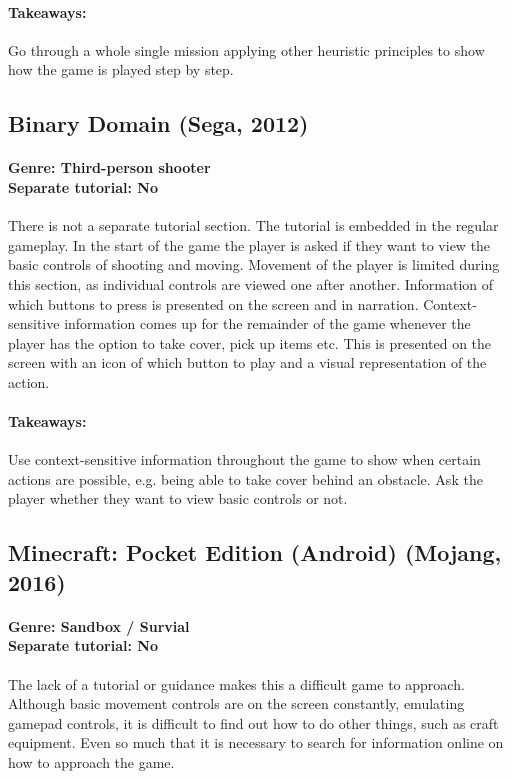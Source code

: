 \paragraph{Takeaways:}
Go through a whole single mission applying other heuristic principles to show how the game is played step by step.

\subsection{Binary Domain (Sega, 2012)}
\paragraph{Genre: Third-person shooter \\ Separate tutorial: No \\} 
There is not a separate tutorial section. The tutorial is embedded in the regular gameplay. In the start of the game the player is asked if they want to view the basic controls of shooting and moving. Movement of the player is limited during this section, as individual controls are viewed one after another. Information of which buttons to press is presented on the screen and in narration. Context-sensitive information comes up for the remainder of the game whenever the player has the option to take cover, pick up items etc. This is presented on the screen with an icon of which button to play and a visual representation of the action.
\paragraph{Takeaways:}
Use context-sensitive information throughout the game to show when certain actions are possible, e.g. being able to take cover behind an obstacle. Ask the player whether they want to view basic controls or not.

\subsection{Minecraft: Pocket Edition (Android) (Mojang, 2016)}
\paragraph{Genre: Sandbox / Survial \\ Separate tutorial: No \\}
The lack of a tutorial or guidance makes this a difficult game to approach. Although basic movement controls are on the screen constantly, emulating gamepad controls, it is difficult to find out how to do other things, such as craft equipment. Even so much that it is necessary to search for information online on how to approach the game. 
